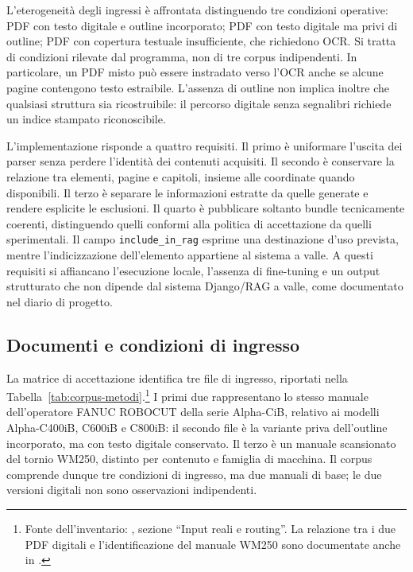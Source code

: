 L'eterogeneità degli ingressi è affrontata distinguendo tre condizioni operative: PDF con testo digitale e outline incorporato; PDF con testo digitale ma privi di outline; PDF con copertura testuale insufficiente, che richiedono OCR. Si tratta di condizioni rilevate dal programma, non di tre corpus indipendenti. In particolare, un PDF misto può essere instradato verso l'OCR anche se alcune pagine contengono testo estraibile. L'assenza di outline non implica inoltre che qualsiasi struttura sia ricostruibile: il percorso digitale senza segnalibri richiede un indice stampato riconoscibile.

L'implementazione risponde a quattro requisiti. Il primo è uniformare l'uscita dei parser senza perdere l'identità dei contenuti acquisiti. Il secondo è conservare la relazione tra elementi, pagine e capitoli, insieme alle coordinate quando disponibili. Il terzo è separare le informazioni estratte da quelle generate e rendere esplicite le esclusioni. Il quarto è pubblicare soltanto bundle tecnicamente coerenti, distinguendo quelli conformi alla politica di accettazione da quelli sperimentali. Il campo \texttt{include\_in\_rag} esprime una destinazione d'uso prevista, mentre l'indicizzazione dell'elemento appartiene al sistema a valle. A questi requisiti si affiancano l'esecuzione locale, l'assenza di fine-tuning e un output strutturato che non dipende dal sistema Django/RAG a valle, come documentato nel diario di progetto.

\subsection{Documenti e condizioni di ingresso}

La matrice di accettazione identifica tre file di ingresso, riportati nella Tabella~\ref{tab:corpus-metodi}.\footnote{Fonte dell'inventario: , sezione ``Input reali e routing''. La relazione tra i due PDF digitali e l'identificazione del manuale WM250 sono documentate anche in .} I primi due rappresentano lo stesso manuale dell'operatore FANUC ROBOCUT della serie Alpha-CiB, relativo ai modelli Alpha-C400iB, C600iB e C800iB: il secondo file è la variante priva dell'outline incorporato, ma con testo digitale conservato. Il terzo è un manuale scansionato del tornio WM250, distinto per contenuto e famiglia di macchina. Il corpus comprende dunque tre condizioni di ingresso, ma due manuali di base; le due versioni digitali non sono osservazioni indipendenti.

